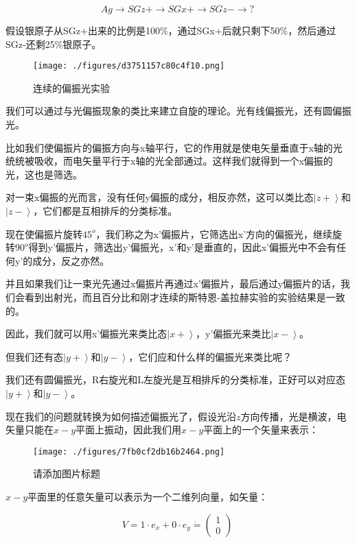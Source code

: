 \begin{equation}
Ag \to SGz+ \to SGx+ \to SGz- \to ?~
\end{equation}

假设银原子从SGz+出来的比例是100\%，通过SGx+后就只剩下50\%，然后通过SGz-还剩25\%银原子。

\begin{figure}[ht]
\centering
\texttt{[image: ./figures/d3751157c80c4f10.png]}
\caption{连续的偏振光实验} \label{fig_QMPre2_24}
\end{figure}

我们可以通过与光偏振现象的类比来建立自旋的理论。光有线偏振光，还有圆偏振光。

比如我们使偏振片的偏振方向与x轴平行，它的作用就是使电矢量垂直于x轴的光统统被吸收，而电矢量平行于x轴的光全部通过。这样我们就得到一个x偏振的光，这也是筛选。

对一束x偏振的光而言，没有任何y偏振的成分，相反亦然，这可以类比态$\left|z+ \right\rangle $和$\left| z- \right\rangle$，它们都是互相排斥的分类标准。

现在使偏振片旋转$45^o$，我们称之为x'偏振片，它筛选出x'方向的偏振光，继续旋转$90^o$得到y'偏振片，筛选出y'偏振光，x'和y'是垂直的，因此x'偏振光中不会有任何y'的成分，反之亦然。

并且如果我们让一束光先通过x偏振片再通过x'偏振片，最后通过y偏振片的话，我们会看到出射光，而且百分比和刚才连续的斯特恩-盖拉赫实验的实验结果是一致的。

因此，我们就可以用x'偏振光来类比态$\left|x+ \right\rangle$，y'偏振光来类比$\left|x- \right\rangle$。

但我们还有态$\left| y+ \right\rangle$和$\left| y- \right\rangle$，它们应和什么样的偏振光来类比呢？

我们还有圆偏振光，R右旋光和L左旋光是互相排斥的分类标准，正好可以对应态$\left| y+ \right\rangle$和$\left| y- \right\rangle$。

现在我们的问题就转换为如何描述偏振光了，假设光沿$z$方向传播，光是横波，电矢量只能在$x-y$平面上振动，因此我们用$x-y$平面上的一个矢量来表示：

\begin{figure}[ht]
\centering
\texttt{[image: ./figures/7fb0cf2db16b2464.png]}
\caption{请添加图片标题} \label{fig_QMPre2_26}
\end{figure}

$x-y$平面里的任意矢量可以表示为一个二维列向量，如矢量：

\begin{equation}
V = 1 \cdot e_x + 0 \cdot e_y  \dot =\left( \begin{array}{ccc} 1 \\ 0 \end{array} \right)~
\end{equation}

